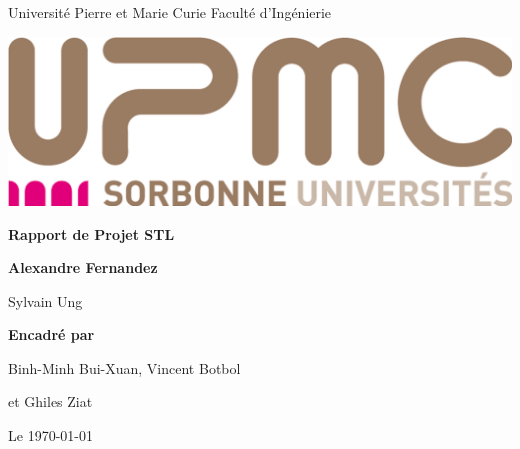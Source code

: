 \begin{titlepage}
\parindent=0pt
Université Pierre et Marie Curie   Faculté d'Ingénierie
\begin{center}
\includegraphics[scale=0.2]{images/logo_upmc.jpg}%
\end{center}
\hrulefill
\begin{center}\bfseries\Huge
  Rapport de Projet STL
\end{center}
\hrulefill
\vspace*{1cm}
\begin{center}\bfseries\Large
Alexandre Fernandez

Sylvain Ung
\end{center}
    
\begin{center}\bfseries\Large
Encadré par

Binh-Minh Bui-Xuan, Vincent Botbol 

et Ghiles Ziat
\end{center}
\begin{flushright}
  Le \today 
\end{flushright}   

\end{titlepage}